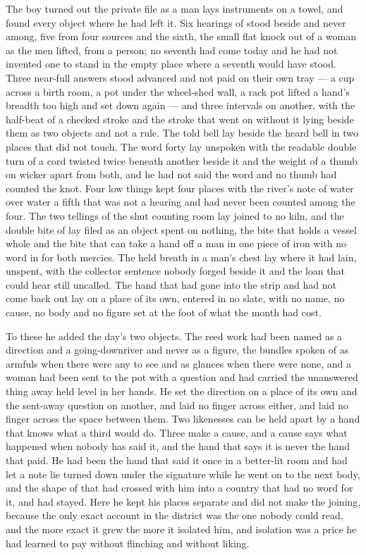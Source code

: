 \scenebreak

The boy turned out the private file as a man lays instruments on a towel, and found every object where he had left it. Six hearings of  stood beside and never among, five from four sources and the sixth, the small flat knock out of a woman as the men lifted, from a person; no seventh had come today and he had not invented one to stand in the empty place where a seventh would have stood. Three near-full answers stood advanced and not paid on their own tray --- a cup across a birth room, a pot under the wheel-shed wall, a rack pot lifted a hand's breadth too high and set down again --- and three intervals on another, with the half-beat of a checked stroke and the stroke that went on without it lying beside them as two objects and not a rule. The told bell lay beside the heard bell in two places that did not touch. The word forty lay unspoken with the readable double turn of a cord twisted twice beneath another beside it and the weight of a thumb on wicker apart from both, and he had not said the word and no thumb had counted the knot. Four low things kept four places with the river's note of water over water a fifth that was not a hearing and had never been counted among the four. The two tellings of the shut counting room lay joined to no kiln, and the double bite of  lay filed as an object spent on nothing, the bite that holds a vessel whole and the bite that can take a hand off a man in one piece of iron with no word in  for both mercies. The held breath in a man's chest lay where it had lain, unspent, with the collector sentence nobody forged beside it and the loan that could hear still uncalled. The hand that had gone into the strip and had not come back out lay on a place of its own, entered in no slate, with no name, no cause, no body and no figure set at the foot of what the month had cost.

To these he added the day's two objects. The reed work had been named as a direction and a going-downriver and never as a figure, the bundles spoken of as armfuls when there were any to see and as glances when there were none, and a woman had been sent to the pot with a question and had carried the unanswered thing away held level in her hands. He set the direction on a place of its own and the sent-away question on another, and laid no finger across either, and laid no finger across the space between them. Two likenesses can be held apart by a hand that knows what a third would do. Three make a cause, and a cause says what happened when nobody has said it, and the hand that says it is never the hand that paid. He had been the hand that said it once in a better-lit room and had let a note lie turned down under the signature while he went on to the next body, and the shape of that had crossed with him into a country that had no word for it, and had stayed. Here he kept his places separate and did not make the joining, because the only exact account in the district was the one nobody could read, and the more exact it grew the more it isolated him, and isolation was a price he had learned to pay without flinching and without liking.

